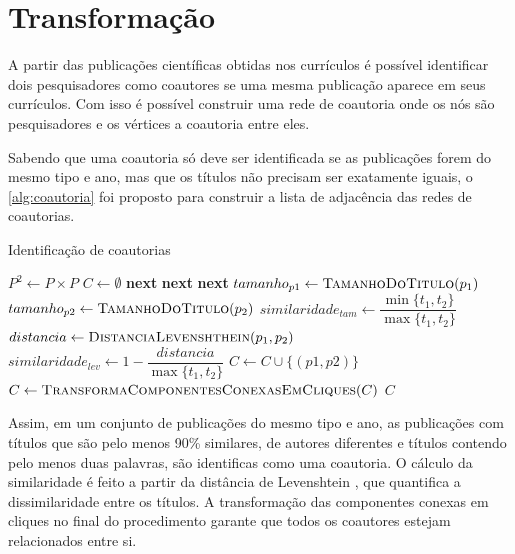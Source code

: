 \section{Transformação}

A partir das publicações científicas obtidas nos currículos é possível identificar dois pesquisadores como coautores se uma mesma publicação aparece em seus currículos. Com isso é possível construir uma rede de coautoria onde os nós são pesquisadores e os vértices a coautoria entre eles.

Sabendo que uma coautoria só deve ser identificada se as publicações forem do mesmo tipo e ano, mas que os títulos não precisam ser exatamente iguais, o \autoref{alg:coautoria} foi proposto para construir a lista de adjacência das redes de coautorias.

\begin{algorithm}
  \caption{Identificação de coautorias}
  \label{alg:coautoria}
  \begin{algorithmic}[1]
    \State $P^2\gets P\times{P}$
    \State $C\gets \emptyset$
      \State \textbf{next}
      \State \textbf{next}
      \State \textbf{next}
    \Else
      \State $tamanho_{p1}\gets \Call{TamanhoDoTitulo}{p_1}$
      \State $tamanho_{p2}\gets \Call{TamanhoDoTitulo}{p_2}$
      \State $similaridade_{tam}\gets \dfrac{\min\{t_1, t_2\}}{\max\{t_1, t_2\}}$
        \State $distancia\gets \Call{DistanciaLevenshthein}{p_1, p_2}$
        \State $similaridade_{lev}\gets 1 - \dfrac{distancia}{\max\{t_1, t_2\}}$
            \State $C\gets C\cup\{(p1, p2)\}$
        \EndIf
      \EndIf
    \EndIf
    \EndFor
    \State $C\gets \Call{TransformaComponentesConexasEmCliques}{C}$
    \State \Return $C$
  \EndProcedure
  \end{algorithmic}
\end{algorithm}

Assim, em um conjunto de publicações do mesmo tipo e ano, as publicações com títulos que são pelo menos 90\% similares, de autores diferentes e títulos contendo pelo menos duas palavras, são identificas como uma coautoria. O cálculo da similaridade é feito a partir da distância de Levenshtein \cite{levenshtein1965binary}, que quantifica a dissimilaridade entre os títulos. A transformação das componentes conexas em cliques no final do procedimento garante que todos os coautores estejam relacionados entre si.

